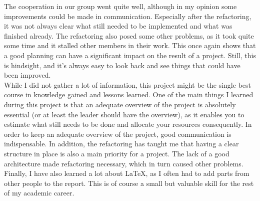 The cooperation in our group went quite well, although in my opinion some improvements could be made in communication. Especially after the refactoring, it was not always clear what still needed to be implemented and what was finished already. The refactoring also posed some other problems, as it took quite some time and it stalled other members in their work. This once again shows that a good planning can have a significant impact on the result of a project. Still, this is hindsight, and it's always easy to look back and see things that could have been improved.\\

While I did not gather a lot of information, this project might be the single best course in knowledge gained and lessons learned. One of the main things I learned during this project is that an adequate overview of the project is absolutely essential (or at least the leader should have the overview), as it enables you to estimate what still needs to be done and allocate your resources consequently. In order to keep an adequate overview of the project, good communication is indispensable. In addition, the refactoring has taught me that having a clear structure in place is also a main priority for a project. The lack of a good architecture made refactoring necessary, which in turn caused other problems. Finally, I have also learned a lot about LaTeX, as I often had to add parts from other people to the report. This is of course a small but valuable skill for the rest of my academic career.\\